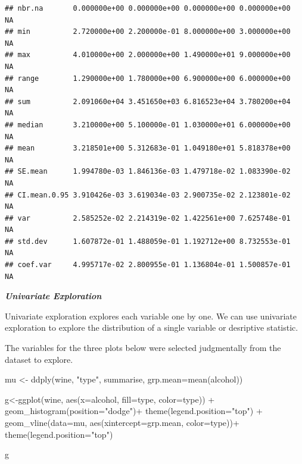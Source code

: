 \documentclass[
]{book}
\newenvironment{Shaded}{\begin{snugshade}}{\end{snugshade}}
\newcommand{\AttributeTok}[1]{\textcolor[rgb]{0.77,0.63,0.00}{#1}}
\newcommand{\FunctionTok}[1]{\textcolor[rgb]{0.00,0.00,0.00}{#1}}
\newcommand{\NormalTok}[1]{#1}
\newcommand{\OtherTok}[1]{\textcolor[rgb]{0.56,0.35,0.01}{#1}}
\newcommand{\SpecialCharTok}[1]{\textcolor[rgb]{0.00,0.00,0.00}{#1}}
\newcommand{\StringTok}[1]{\textcolor[rgb]{0.31,0.60,0.02}{#1}}
\begin{document}
\begin{verbatim}
## nbr.na       0.000000e+00 0.000000e+00 0.000000e+00 0.000000e+00   NA
## min          2.720000e+00 2.200000e-01 8.000000e+00 3.000000e+00   NA
## max          4.010000e+00 2.000000e+00 1.490000e+01 9.000000e+00   NA
## range        1.290000e+00 1.780000e+00 6.900000e+00 6.000000e+00   NA
## sum          2.091060e+04 3.451650e+03 6.816523e+04 3.780200e+04   NA
## median       3.210000e+00 5.100000e-01 1.030000e+01 6.000000e+00   NA
## mean         3.218501e+00 5.312683e-01 1.049180e+01 5.818378e+00   NA
## SE.mean      1.994780e-03 1.846136e-03 1.479718e-02 1.083390e-02   NA
## CI.mean.0.95 3.910426e-03 3.619034e-03 2.900735e-02 2.123801e-02   NA
## var          2.585252e-02 2.214319e-02 1.422561e+00 7.625748e-01   NA
## std.dev      1.607872e-01 1.488059e-01 1.192712e+00 8.732553e-01   NA
## coef.var     4.995717e-02 2.800955e-01 1.136804e-01 1.500857e-01   NA
\end{verbatim}

\textbf{\emph{Univariate Exploration}}

Univariate exploration explores each variable one by one. We can use univariate exploration to explore the distribution of a single variable or desriptive statistic.

The variables for the three plots below were selected judgmentally from the dataset to explore.

\begin{Shaded}
\begin{Highlighting}[]
\NormalTok{mu }\OtherTok{\textless{}{-}} \FunctionTok{ddply}\NormalTok{(wine, }\StringTok{"type"}\NormalTok{, summarise, }\AttributeTok{grp.mean=}\FunctionTok{mean}\NormalTok{(alcohol))}

\NormalTok{g}\OtherTok{\textless{}{-}}\FunctionTok{ggplot}\NormalTok{(wine, }\FunctionTok{aes}\NormalTok{(}\AttributeTok{x=}\NormalTok{alcohol, }\AttributeTok{fill=}\NormalTok{type, }\AttributeTok{color=}\NormalTok{type)) }\SpecialCharTok{+}
  \FunctionTok{geom\_histogram}\NormalTok{(}\AttributeTok{position=}\StringTok{"dodge"}\NormalTok{)}\SpecialCharTok{+}
  \FunctionTok{theme}\NormalTok{(}\AttributeTok{legend.position=}\StringTok{"top"}\NormalTok{) }\SpecialCharTok{+} 
  \FunctionTok{geom\_vline}\NormalTok{(}\AttributeTok{data=}\NormalTok{mu, }\FunctionTok{aes}\NormalTok{(}\AttributeTok{xintercept=}\NormalTok{grp.mean, }\AttributeTok{color=}\NormalTok{type))}\SpecialCharTok{+}
  \FunctionTok{theme}\NormalTok{(}\AttributeTok{legend.position=}\StringTok{"top"}\NormalTok{)}

\NormalTok{g}
\end{Highlighting}
\end{Shaded}
\end{document}
